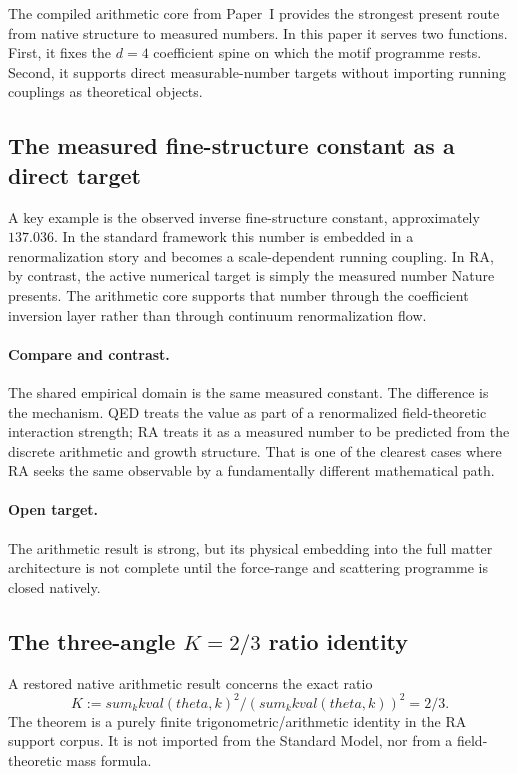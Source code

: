 \documentclass[11pt]{article}
\def\theta{theta}%
\def\mathrm#1{#1}%
\def\frac#1#2{#1/#2}%
\def\sum{sum}%
\begin{document}
The compiled arithmetic core from Paper~I provides the strongest present route from native structure to measured numbers. In this paper it serves two functions. First, it fixes the $d=4$ coefficient spine on which the motif programme rests. Second, it supports direct measurable-number targets without importing running couplings as theoretical objects.

\subsection{The measured fine-structure constant as a direct target}

A key example is the observed inverse fine-structure constant, approximately $137.036$. In the standard framework this number is embedded in a renormalization story and becomes a scale-dependent running coupling. In RA, by contrast, the active numerical target is simply the measured number Nature presents. The arithmetic core supports that number through the coefficient inversion layer rather than through continuum renormalization flow.

\paragraph{Compare and contrast.} The shared empirical domain is the same measured constant. The difference is the mechanism. QED treats the value as part of a renormalized field-theoretic interaction strength; RA treats it as a measured number to be predicted from the discrete arithmetic and growth structure. That is one of the clearest cases where RA seeks the same observable by a fundamentally different mathematical path.

\paragraph{Open target.} The arithmetic result is strong, but its physical embedding into the full matter architecture is not complete until the force-range and scattering programme is closed natively.

\subsection{The three-angle $K=2/3$ ratio identity}

A restored native arithmetic result concerns the exact ratio
\begin{equation}
K:=\frac{\sum_k \mathrm{kval}(\theta,k)^2}{\left(\sum_k \mathrm{kval}(\theta,k)\right)^2}=\frac{2}{3}.
\end{equation}
The theorem is a purely finite trigonometric/arithmetic identity in the RA support corpus. It is not imported from the Standard Model, nor from a field-theoretic mass formula.
\end{document}
